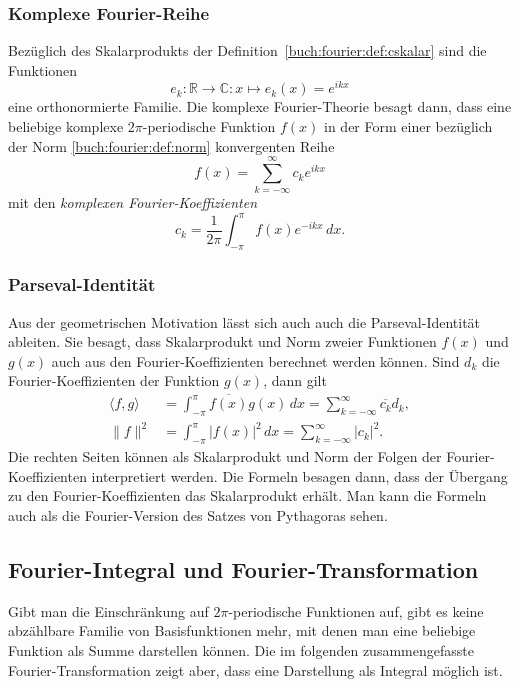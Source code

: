 %
%
\subsubsection{Komplexe Fourier-Reihe}
Bezüglich des Skalarprodukts
der Definition~\ref{buch:fourier:def:cskalar}
sind die Funktionen
\[
e_k
:
\mathbb{R} \to \mathbb{C}
\colon
x\mapsto e_k(x)=e^{ikx}
\]
%
eine orthonormierte Familie.
Die komplexe Fourier-Theorie besagt dann,
dass eine beliebige komplexe $2\pi$-periodische Funktion $f(x)$ 
in der Form einer bezüglich der Norm \eqref{buch:fourier:def:norm}
konvergenten Reihe
\begin{equation}
f(x)
=
\sum_{k=-\infty}^\infty c_ke^{ikx}
\label{buch:fourier:eqn:cfourierreihe}
\end{equation}
mit den {\em komplexen Fourier-Koeffizienten}
\begin{equation}
c_k
=
\frac{1}{2\pi}
\int_{-\pi}^\pi
f(x) e^{-ikx}\,dx.
\label{buch:fourier:def:ckoef}
\end{equation}
%
%

\subsubsection{Parseval-Identität}
Aus der geometrischen Motivation lässt sich auch auch die
Parseval-Identität ableiten.
%
Sie besagt, dass Skalarprodukt und Norm zweier Funktionen
$f(x)$ und $g(x)$ auch aus den Fourier-Koeffizienten
berechnet werden können.
Sind $d_k$ die Fourier-Koeffizienten der Funktion $g(x)$, dann gilt
\begin{align*}
\langle f,g\rangle
&=
\int_{-\pi}^\pi \overline{f(x)} g(x)\,dx
=
\sum_{k=-\infty}^\infty \overline{c_k}d_k,
\\
\|f\|^2
&=
\int_{-\pi}^\pi |f(x)|^2\,dx
=
\sum_{k=-\infty}^{\infty} |c_k|^2.
\end{align*}
Die rechten Seiten können als Skalarprodukt und Norm der Folgen
der Fourier-Koeffizienten interpretiert werden.
Die Formeln besagen dann, dass der Übergang zu den Fourier-Koeffizienten
das Skalarprodukt erhält.
Man kann die Formeln auch als die Fourier-Version des Satzes
von Pythagoras sehen.
%
%

%
%
\subsection{Fourier-Integral und Fourier-Transformation}
Gibt man die Einschränkung auf $2\pi$-periodische Funktionen
auf, gibt es keine abzählbare Familie von Basisfunktionen mehr,
mit denen man eine beliebige Funktion als Summe darstellen können.
Die im folgenden zusammengefasste Fourier-Transformation zeigt
aber, dass eine Darstellung als Integral möglich ist.

